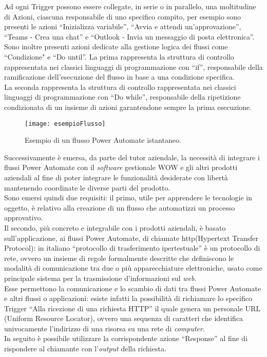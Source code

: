 \noindent Ad ogni Trigger possono essere collegate, in serie o in parallelo, una moltitudine di Azioni, ciascuna responsabile di uno specifico compito, per esempio sono presenti le azioni “Inizializza variabile”, “Avvia e attendi un'approvazione”, “Teams - Crea una chat” e “Outlook - Invia un messaggio di posta elettronica”.\\
Sono inoltre presenti azioni dedicate alla gestione logica dei flussi come “Condizione" e “Do until”. La prima rappresenta la struttura di controllo rappresentata nei classici linguaggi di programmazione con “if”, responsabile della ramificazione dell'esecuzione del flusso in base a una condizione specifica.\\
La seconda rappresenta la struttura di controllo rappresentata nei classici linguaggi di programmazione con “Do while”, responsabile della ripetizione condizionata di un insieme di azioni garantendone sempre la prima esecuzione.\\

\begin{figure}[htbp] 
    \centering 
    \texttt{[image: esempioFlusso]} 
    \caption{Esempio di un flusso Power Automate istantaneo.}
    \label{fig:esempioFlusso}
\end{figure}
\noindent Successivamente è emersa, da parte del tutor aziendale, la necessità di integrare i flussi Power Automate con il \emph{software} gestionale WOW e gli altri prodotti aziendali al fine di poter integrare le funzionalità desiderate con libertà mantenendo coordinate le diverse parti del prodotto.\\
Sono emersi quindi due requisiti: il primo, utile per apprendere le tecnologie in oggetto, è relativo alla creazione di un flusso che automatizzi un processo approvativo.\\
Il secondo, più concreto e integrabile con i prodotti aziendali, è basato sull'applicazione, ai flussi Power Automate, di chiamate \gls{http}(Hypertext Transfer Protocol): in italiano “protocollo di trasferimento ipertestuale” è un protocollo di rete, ovvero un insieme di regole formalmente descritte che definiscono le modalità di comunicazione tra due o più apparecchiature elettroniche, usato come principale sistema per la trasmissione d'informazioni sul \emph{web}.\\
Esse permettono la comunicazione e lo scambio di dati tra flussi Power Automate e altri flussi o applicazioni: esiste infatti la possibilità di richiamare lo specifico Trigger “Alla ricezione di una richiesta HTTP” il quale genera un personale URL (Uniform Resource Locator), ovvero una sequenza di caratteri che identifica univocamente l'indirizzo di una risorsa su una rete di \emph{computer}.\\
In seguito è possibile utilizzare la corrispondente azione “Response” al fine di rispondere al chiamante con l'\emph{output} della richiesta.\\

